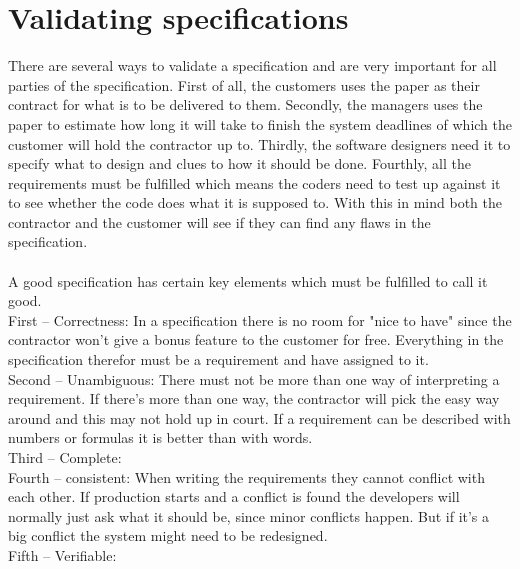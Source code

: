 \documentclass[Main]{subfiles}
\begin{document}
\section{Validating specifications}


There are several ways to validate a specification and are very important for all parties of the specification.
First of all, the customers uses the paper as their contract for what is to be delivered to them.
Secondly, the managers uses the paper to estimate how long it will take to finish the system deadlines of which the customer will hold the contractor up to.
Thirdly, the software designers need it to specify what to design and clues to how it should be done.
Fourthly, all the requirements must be fulfilled which means the coders need to test up against it to see whether the code does what it is supposed to.
With this in mind both the contractor and the customer will see if they can find any flaws in the specification.
\\
\\
A good specification has certain key elements which must be fulfilled to call it good.
\\
First -- Correctness:
In a specification there is no room for "nice to have" since the contractor won't give a bonus  feature to the customer for free.
Everything in the specification therefor must be a requirement and have assigned to it.
\\
Second -- Unambiguous:
There must not be more than one way of interpreting a requirement. 
If there's more than one way, the contractor will pick the easy way around and this may not hold up in court.
If a requirement can be described with numbers or formulas it is better than with words.
\\
Third -- Complete:
\\
Fourth -- consistent:
When writing the requirements they cannot conflict with each other.
If production starts and a conflict is found the developers will normally just ask what it should be, since minor conflicts happen.
But if it's a big conflict the system might need to be redesigned. 
\\
Fifth -- Verifiable:
\end{document}

